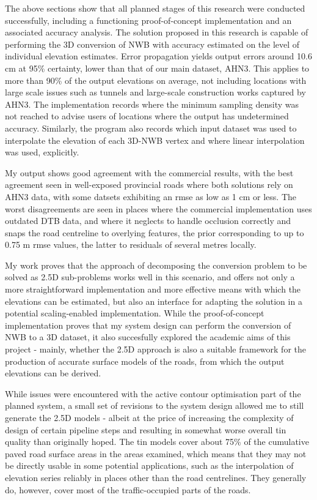 The above sections show that all planned stages of this research were conducted successfully, including a functioning proof-of-concept implementation and an associated accuracy analysis. The solution proposed in this research is capable of performing the 3D conversion of NWB with accuracy estimated on the level of individual elevation estimates. Error propagation yields output errors around 10.6 cm at 95\% certainty, lower than that of our main dataset, AHN3. This applies to more than 90\% of the output elevations on average, not including locations with large scale issues such as tunnels and large-scale construction works captured by AHN3. The implementation records where the minimum sampling density was not reached to advise users of locations where the output has undetermined accuracy. Similarly, the program also records which input dataset was used to interpolate the elevation of each 3D-NWB vertex and where linear interpolation was used, explicitly.

My output shows good agreement with the commercial results, with the best agreement seen in well-exposed provincial roads where both solutions rely on AHN3 data, with some datsets exhibiting an \ac{rmse} as low as 1 cm or less. The worst disagreements are seen in places where the commercial implementation uses outdated DTB data, and where it neglects to handle occlusion correctly and snaps the road centreline to overlying features, the prior corresponding to up to 0.75 m \ac{rmse} values, the latter to residuals of several metres locally.

My work proves that the approach of decomposing the conversion problem to be solved as 2.5D sub-problems works well in this scenario, and offers not only a more straightforward implementation and more effective means with which the elevations can be estimated, but also an interface for adapting the solution in a potential scaling-enabled implementation. While the proof-of-concept implementation proves that my system design can perform the conversion of NWB to a 3D dataset, it also succesfully explored the academic aims of this project - mainly, whether the 2.5D approach is also a suitable framework for the production of accurate surface models of the roads, from which the output elevations can be derived.

While issues were encountered with the active contour optimisation part of the planned system, a small set of revisions to the system design allowed me to still generate the 2.5D models - albeit at the price of increasing the complexity of design of certain pipeline steps and resulting in somewhat worse overall \ac{tin} quality than originally hoped. The \ac{tin} models cover about 75\% of the cumulative paved road surface areas in the areas examined, which means that they may not be directly usable in some potential applications, such as the interpolation of elevation series reliably in places other than the road centrelines. They generally do, however, cover most of the traffic-occupied parts of the roads.

